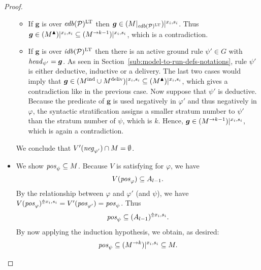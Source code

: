 \documentclass{tlp}
\newcommand{\ded}{\mathcal{P}}
\newcommand{\fcB}{\boldsymbol{g}}
\newcommand{\proj}[2]{#1|_{#2}}
\newcommand{\rl}{\varphi}
\newcommand{\head}[1]{\fname{head}_{#1}}
\newcommand{\bpos}[1]{\fname{pos}_{#1}}
\newcommand{\bneg}[1]{\fname{neg}_{#1}}
\newcommand{\idb}[1]{\fname{idb}(#1)}
\newcommand{\edb}[1]{\fname{edb}(#1)}
\newcommand{\grl}{\psi}
\newcommand{\sh}[1]{(#1)}
\newcommand{\toloct}[1]{#1^{\mathrm{LT}}}
\newcommand{\addlt}[3]{#1^{\Uparrow#2,#3}}
\newcommand{\projlt}[3]{#1|^{#2,#3}}
\newcommand{\shprojlt}[3]{\projlt{\sh{#1}}{#2}{#3}}
\newcommand{\shaddlt}[3]{\addlt{\sh{#1}}{#2}{#3}}
\newcommand{\grded}{G}
\begin{document}
\begin{appendix}
\begin{proof}
\begin{itemize}
\begin{itemize}
\item If $\fcB$ is over $\toloct{\edb{\ded}}$ then $\fcB\in\shprojlt{\proj M{\toloct{\edb{\ded}}}}{x_{i}}{s_{i}}$.
Thus $\fcB\in\shprojlt{\up M}{x_{i}}{s_{i}}\subseteq\shprojlt{\strat M{k-1}}{x_{i}}{s_{i}}$,
which is a contradiction.
\item If $\fcB$ is over $\toloct{\idb{\ded}}$ then there is an active
ground rule $\grl'\in\grded$ with $\head{\grl'}=\fcB$. As seen in
Section~\ref{sub:model-to-run-defs-notations}, rule $\grl'$ is
either deductive, inductive or a delivery. The last two cases would
imply that $\fcB\in\shprojlt{\ind M\cup\deliv M}{x_{i}}{s_{i}}\subseteq\shprojlt{\up M}{x_{i}}{s_{i}}$,
which gives a contradiction like in the previous case. Now suppose
that $\grl'$ is deductive. Because the predicate of $\fcB$ is used
negatively in $\rl'$ and thus negatively in $\rl$, the syntactic
stratification assigns a smaller stratum number to $\grl'$ than the
stratum number of $\grl$, which is $k$. Hence, $\fcB\in\shprojlt{\strat M{k-1}}{x_{i}}{s_{i}}$,
which is again a contradiction.
\end{itemize}

We conclude that $V'(\bneg{\rl'})\cap M=\emptyset$.

\item We show $\bpos{\grl}\subseteq M$. Because $V$ is satisfying for
$\rl$, we have 
\[
V(\bpos{\rl})\subseteq A_{l-1}.
\]
By the relationship between $\rl$ and $\rl'$ (and $\grl$), we have
$\addlt{V(\bpos{\rl})}{x_{i}}{s_{i}}=V'(\bpos{\rl'})=\bpos{\grl}$.
Thus 
\[
\bpos{\grl}\subseteq\shaddlt{A_{l-1}}{x_{i}}{s_{i}}.
\]
By now applying the induction hypothesis, we obtain, as desired: 
\[
\bpos{\grl}\subseteq\shprojlt{\strat Mk}{x_{i}}{s_{i}}\subseteq M.
\]

\end{itemize}
\end{proof}



\tline


\end{appendix}
 
\end{document}
